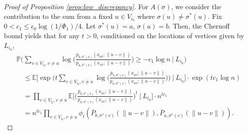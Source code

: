 \documentclass{article}
\renewcommand{\P}{\mathbb{P}}
\newcommand{\E}{\mathbb{E}}
\newcommand{\1}{\mathbbm{1}}
\theoremstyle{definition}
\theoremstyle{plain}
\begin{document}
\begin{proof}[Proof of Proposition \ref{prop:low_discrepancy}]
    For $A(\sigma)$, we consider the contribution to the sum from a fixed $u \in V_{i_0}$ where $\sigma(u) \neq \sigma^*(u)$. Fix $0 < c_1 \leq \epsilon_0 \log(1 / \Phi_1) / 4$. Let $\sigma^*(u) = a$, $\sigma(u) = b$. Then, the Chernoff bound yields that for any $t > 0$, conditioned on the locations of vertices given by $L_{i_0}$, 
    \begin{align*}
        &\P\bigg(\sum_{v \in V_{i_0}, v \neq u} \log \bigg(\frac{\overline{p}_{b,\sigma^*(v)}(x_{uv}; \|u - v\|)}{\overline{p}_{a,\sigma^*(v)}(x_{uv}; \|u - v\|)} \bigg) \geq -c_1 \log n \: \Big| \: L_{i_0}\bigg) \\
        &\quad\leq \E\bigg[ \exp\bigg(t \sum_{v \in V_{i_0}, v \neq u} \log \bigg(\frac{\overline{p}_{b,\sigma^*(v)}(x_{uv}; \|u - v\|)}{\overline{p}_{a,\sigma^*(v)}(x_{uv}; \|u - v\|)} \bigg) \bigg) \: \Big| \: L_{i_0}  \bigg] \cdot \exp(tc_1 \log n) \\
        &\quad= \prod_{v \in V_{i_0}, v \neq u} \E\bigg[ \bigg(\frac{\overline{p}_{b,\sigma^*(v)}(x_{uv}; \|u - v\|)}{\overline{p}_{a,\sigma^*(v)}(x_{uv}; \|u - v\|)}\bigg)^t \: \Big| \: L_{i_0} \bigg] \cdot n^{tc_1} \\
        &\quad= n^{tc_1} \prod_{v \in V_{i_0}, v \neq u} \phi_t(\overline{P}_{b,\sigma^*(v)}(\|u - v\|), \overline{P}_{a,\sigma^*(v)}(\|u - v\|)).
    \end{align*}


\end{proof}
\end{document}
